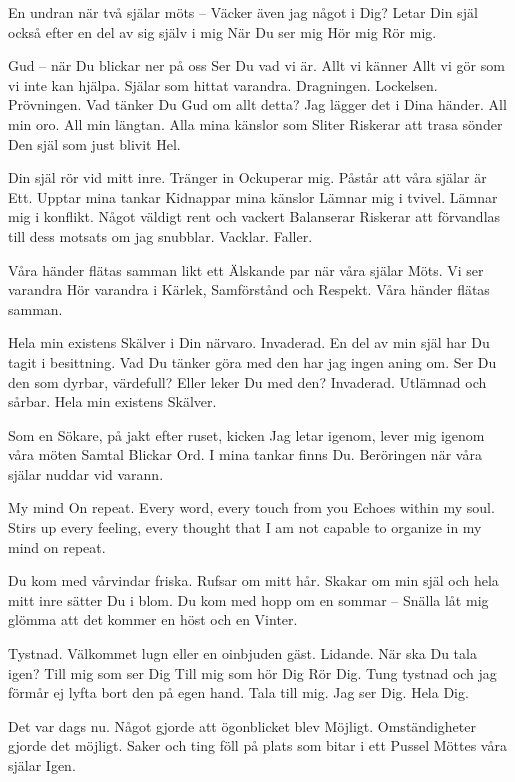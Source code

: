 En undran 
när två själar möts – 
Väcker även jag något i Dig?
Letar Din själ också efter
en del av sig själv i mig
När Du ser mig
Hör mig
Rör mig.
\stoppoem

\startpoem
Gud – när Du blickar ner på oss
Ser Du vad vi är.
Allt vi känner
Allt vi gör som vi inte kan hjälpa.
Själar som hittat 
varandra.
Dragningen.
Lockelsen.
Prövningen.
Vad tänker Du Gud om allt detta?
Jag lägger det i Dina händer.
All min oro.
All min längtan.
Alla mina känslor som
Sliter
Riskerar att trasa sönder
Den själ som just blivit 
Hel.
\stoppoem

\startpoem
Din själ
rör vid mitt inre.
Tränger in
Ockuperar mig.
Påstår att våra själar är
Ett.
Upptar mina tankar
Kidnappar mina känslor
Lämnar mig i tvivel.
Lämnar mig i konflikt.
Något väldigt rent och vackert
Balanserar
Riskerar att förvandlas
till dess motsats
om jag snubblar.
Vacklar.
Faller.
\stoppoem

\startpoem
Våra händer
flätas samman
likt ett 
Älskande par
när våra själar 
Möts.
Vi ser varandra
Hör varandra
i Kärlek, 
Samförstånd och
Respekt.
Våra händer
flätas samman.
\stoppoem

\startpoem
Hela min existens
Skälver 
i Din närvaro.
Invaderad.
En del av min själ har Du tagit 
i besittning.
Vad Du tänker göra med den
har jag ingen aning om.
Ser Du den som dyrbar, värdefull?
Eller leker Du med den?
Invaderad.
Utlämnad och sårbar.
Hela min existens 
Skälver.
\stoppoem

\startpoem
Som en Sökare,
på jakt efter ruset, kicken
Jag letar igenom,
lever mig igenom
våra möten
Samtal
Blickar
Ord.
I mina tankar finns
Du.
Beröringen
när våra själar
nuddar vid
varann.
\stoppoem

\startpoem
My mind
On repeat.
Every word,
every touch from you
Echoes within my soul.
Stirs up every feeling,
every thought that I am not capable
to organize
in my mind
on repeat.


Du kom med vårvindar friska.
Rufsar om mitt hår.
Skakar om min själ och hela mitt inre
sätter Du i blom. 
Du kom med hopp 
om en sommar – 
Snälla låt mig glömma 
att det kommer en höst
och en 
Vinter.
\stoppoem

\startpoem
Tystnad.
Välkommet lugn
eller en oinbjuden gäst.
Lidande.
När ska Du tala igen?
Till mig som ser Dig
Till mig som hör Dig
Rör Dig.
Tung tystnad
och jag förmår ej lyfta bort den
på egen hand.
Tala till mig.
Jag ser Dig. 
Hela Dig.
\stoppoem

\startpoem
Det var dags nu.
Något gjorde att ögonblicket blev
Möjligt.
Omständigheter gjorde det möjligt.
Saker och ting
föll på plats 
som bitar i ett 
Pussel
Möttes våra själar 
Igen.


